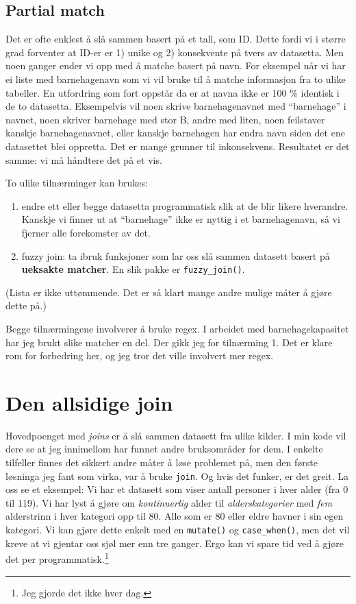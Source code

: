 \documentclass[
  letterpaper,
  DIV=11,
  numbers=noendperiod]{scrreprt}
\providecommand{\tightlist}{%
  \setlength{\itemsep}{0pt}\setlength{\parskip}{0pt}}\usepackage{longtable,booktabs,array}
\begin{document}
\hypertarget{partial-match}{%
\subsection{Partial match}\label{partial-match}}

Det er ofte enklest å slå sammen basert på et tall, som ID. Dette fordi
vi i større grad forventer at ID-er er 1) unike og 2) konsekvente på
tvers av datasetta. Men noen ganger ender vi opp med å matche basert på
navn. For eksempel når vi har ei liste med barnehagenavn som vi vil
bruke til å matche informasjon fra to ulike tabeller. En utfordring som
fort oppstår da er at navna ikke er 100 \% identisk i de to datasetta.
Eksempelvis vil noen skrive barnehagenavnet med ``barnehage'' i navnet,
noen skriver barnehage med stor B, andre med liten, noen feilstaver
kanskje barnehagenavnet, eller kanskje barnehagen har endra navn siden
det ene datasettet blei oppretta. Det er mange grunner til inkonsekvens.
Resultatet er det samme: vi må håndtere det på et vis.

To ulike tilnærminger kan brukes:

\begin{enumerate}
\def\labelenumi{\arabic{enumi}.}
\tightlist
\item
  endre ett eller begge datasetta programmatisk slik at de blir likere
  hverandre. Kanskje vi finner ut at ``barnehage'' ikke er nyttig i et
  barnehagenavn, så vi fjerner alle forekomster av det.
\item
  fuzzy join: ta ibruk funksjoner som lar oss slå sammen datasett basert
  på \textbf{ueksakte matcher}. En slik pakke er \texttt{fuzzy\_join()}.
\end{enumerate}

(Lista er ikke uttømmende. Det er så klart mange andre mulige måter å
gjøre dette på.)

Begge tilnærmingene involverer å bruke regex. I arbeidet med
barnehagekapasitet har jeg brukt slike matcher en del. Der gikk jeg for
tilnærming 1. Det er klare rom for forbedring her, og jeg tror det ville
involvert mer regex.

\hypertarget{den-allsidige-join}{%
\section{Den allsidige join}\label{den-allsidige-join}}

Hovedpoenget med \emph{joins} er å slå sammen datasett fra ulike kilder.
I min kode vil dere se at jeg innimellom har funnet andre bruksområder
for dem. I enkelte tilfeller finnes det sikkert andre måter å løse
problemet på, men den første løsninga jeg fant som virka, var å bruke
\texttt{join}. Og hvis det funker, er det greit. La oss se et eksempel:
Vi har et datasett som viser antall personer i hver alder (fra 0 til
119). Vi har lyst å gjøre om \emph{kontinuerlig} alder til
\emph{alderskategorier} med \emph{fem} alderstrinn i hver kategori opp
til 80. Alle som er 80 eller eldre havner i sin egen kategori. Vi kan
gjøre dette enkelt med en \texttt{mutate()} og \texttt{case\_when()},
men det vil kreve at vi gjentar oss sjøl mer enn tre ganger. Ergo kan vi
spare tid ved å gjøre det per programmatisk.\footnote{Jeg gjorde det
  ikke hver dag.}
\end{document}

